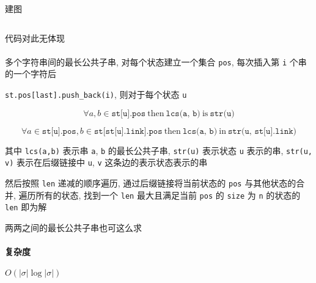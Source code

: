 建图
\inputminted{cpp}{src/src/exsam_build.txt}

代码对此无体现\\
\\


多个字符串间的最长公共子串, 对每个状态建立一个集合 \verb|pos|, 每次插入第 \verb|i| 个串的一个字符后

\verb|st.pos[last].push_back(i)|, 则对于每个状态 \verb|u|

\[
    \forall a,b \in \texttt{st[u].pos}~\text{then}~\texttt{lcs(a, b)}~\text{is}~\texttt{str(u)}
\]

\[
    \forall a\in \texttt{st[u].pos}, b\in \texttt{st[st[u].link].pos}~\text{then}~\texttt{lcs(a, b)} ~\text{in}~ \texttt{str(u, st[u].link)}
\]

其中 \verb|lcs(a,b)| 表示串 \verb|a|, \verb|b| 的最长公共子串, \verb|str(u)| 表示状态 \verb|u| 表示的串, \verb|str(u, v)| 表示在后缀链接中 \verb|u|, \verb|v| 这条边的表示状态表示的串

然后按照 \verb|len| 递减的顺序遍历, 通过后缀链接将当前状态的 \verb|pos| 与其他状态的合并, 遍历所有的状态, 找到一个 \verb|len| 最大且满足当前 \verb|pos| 的 \verb|size| 为 \verb|n| 的状态的 \verb|len| 即为解

两两之间的最长公共子串也可这么求

\paragraph{复杂度}

\(O(|\sigma| \log|\sigma|)\)
